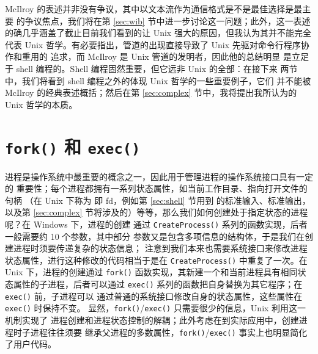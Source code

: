 McIlroy 的表述并非没有争议，其中以文本流作为通信格式是不是最佳选择是最主要
的争议焦点，我们将在第 \ref{sec:wib} 节中进一步讨论这一问题；此外，这一表述
的确几乎涵盖了截止目前我们看到的让 Unix 强大的原因，但我认为其并不能完全代表
Unix 哲学。有必要指出，管道的出现直接导致了 Unix 先驱对命令行程序协作和重用的
追求，而 McIlroy 是 Unix 管道的发明者，因此他的总结明显
是立足于 shell 编程的。Shell 编程固然重要，但它远非 Unix 的全部：在接下来
两节中，我们将看到 shell 编程之外的体现 Unix 哲学的一些重要例子，它们
并不能被 McIlroy 的经典表述概括；然后在第 \ref{sec:complex}
节中，我将提出我所认为的 Unix 哲学的本质。

\section{\texttt{fork()} 和 \texttt{exec()}}\label{sec:exec}

进程是操作系统中最重要的概念之一，因此用于管理进程的操作系统接口具有一定的
重要性；每个进程都拥有一系列状态属性，如当前工作目录、指向打开文件的句柄
（在 Unix 下称为 即 fd，例如第 \ref{sec:shell} 节用到
的标准输入、标准输出，以及第 \ref{sec:complex} 节将涉及的）等等，那么我们如何创建处于指定状态的进程呢？在 Windows 下，进程的创建
通过 \verb|CreateProcess()| 系列的函数实现，后者一般需要约 10 个参数，其中部分
参数又是包含多项信息的结构体，于是我们在创建进程时须要传递复杂的状态信息；
注意到我们本来也需要系统接口来修改进程状态属性，进行这种修改的代码相当于是在
\verb|CreateProcess()| 中重复了一次。在 Unix 下，进程的创建通过 \verb|fork()|
函数实现，其新建一个和当前进程具有相同状态属性的子进程，后者可以通过
\verb|exec()| 系列的函数把自身替换为其它程序；在 \verb|exec()| 前，子进程可以
通过普通的系统接口修改自身的状态属性，这些属性在 \verb|exec()| 时保持不变。
显然，\verb|fork()|/\verb|exec()| 只需要很少的信息，Unix 利用这一机制实现了
进程创建和进程状态控制的解耦；此外考虑在到实际应用中，创建进程时子进程往往须要
继承父进程的多数属性，\verb|fork()|/\verb|exec()| 事实上也明显简化了用户代码。

